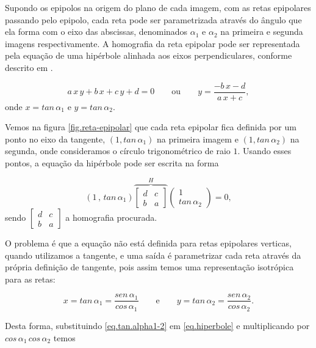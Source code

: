 Supondo os epipolos na origem do plano de cada imagem, com as retas epipolares passando pelo epipolo, cada reta pode ser parametrizada através do ângulo que ela forma com o eixo das abscissas, denominados $\alpha_1$ e $\alpha_2$ na primeira e segunda imagens respectivamente.
A homografia da reta epipolar pode ser representada pela equação de uma hipérbole alinhada aos eixos perpendiculares, conforme descrito em \cite{Fabbri:Kimia:IJCV2015}.

\begin{equation}\label{eq.hiperbole}
a\,x\,y+b\,x+c\,y+d=0 \qquad \text{ou} \qquad y=\frac{-b\,x-d}{a\,x+c},
\end{equation} 
onde $x=tan\,\alpha_1$ e $y=tan\,\alpha_2$. 

Vemos na figura \ref{fig.reta-epipolar} que cada reta epipolar fica definida por um ponto no eixo da tangente, $(1,tan\,\alpha_1)$ na primeira imagem e $(1,tan\,\alpha_2)$ na segunda, onde consideramos o círculo trigonométrico de raio $1$. Usando esses pontos, a equação da hipérbole pode ser escrita na forma

\begin{equation*}
(1\,,\,tan\,\alpha_1)
\overbrace{
\begin{bmatrix}
d&c\\
b&a
\end{bmatrix}
}^{H}
\begin{pmatrix}
1\\
tan\,\alpha_2
\end{pmatrix}
=0,
\end{equation*}
sendo 
$\begin{bmatrix}d&c\\b&a\end{bmatrix}$ a homografia procurada.

O problema é que a equação não está definida para retas epipolares verticas, quando utilizamos a tangente, e uma saída é parametrizar cada reta através da própria definição de tangente, pois assim temos uma representação isotrópica para as retas:

\begin{equation}\label{eq.tan.alpha1-2}
x=tan\,\alpha_1=\frac{sen\,\alpha_1 }{cos\,\alpha_1} \qquad \text{e} \qquad y=tan\,\alpha_2=\frac{sen\,\alpha_2}{cos\,\alpha_2}.
\end{equation} 

Desta forma, substituindo \ref{eq.tan.alpha1-2} em \ref{eq.hiperbole} e multiplicando por $cos\,\alpha_1\,cos\,\alpha_2$ temos

